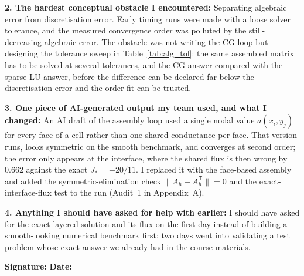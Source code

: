 \begin{formbox}
\textbf{2. The hardest conceptual obstacle I encountered:}
Separating algebraic error from discretisation error. Early timing runs were
made with a loose solver tolerance, and the measured convergence order was
polluted by the still-decreasing algebraic error. The obstacle was not writing
the CG loop but designing the tolerance sweep in Table~\ref{tab:alg_tol}: the
same assembled matrix has to be solved at several tolerances, and the CG answer
compared with the sparse-LU answer, before the difference can be declared far
below the discretisation error and the order fit can be trusted.

\textbf{3. One piece of AI-generated output my team used, and what I changed:}
An AI draft of the assembly loop used a single nodal value $a(x_i,y_j)$ for
every face of a cell rather than one shared conductance per face. That version
runs, looks symmetric on the smooth benchmark, and converges at second order;
the error only appears at the interface, where the shared flux is then wrong by
$0.662$ against the exact $J_*=-20/11$. I replaced it with the face-based
assembly and added the symmetric-elimination check
$\|A_h-A_h^{\mathsf T}\|=0$ and the exact-interface-flux test to the run
(Audit~1 in Appendix~A).

\textbf{4. Anything I should have asked for help with earlier:}
I should have asked for the exact layered solution and its flux on the first
day instead of building a smooth-looking numerical benchmark first; two days
went into validating a test problem whose exact answer we already had in the
course materials.

\textbf{Signature:} \underline{\hspace{4.2cm}} \hfill
\textbf{Date:} \underline{\hspace{2.2cm}}
\end{formbox}
